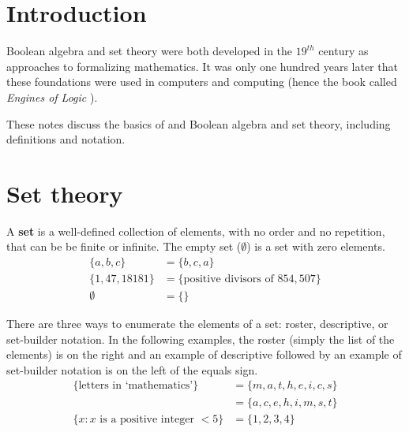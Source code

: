 \documentclass[11pt]{article}%
\begin{document}
\setlength{\baselineskip}{1.1\baselineskip}%


\begin{multicols}{2}

\section{Introduction}
\label{Introduction}

Boolean algebra and set theory were both developed in the $19^{th}$ century as approaches to formalizing mathematics. It was only one hundred years later that these foundations were used in computers and computing (hence the book called \textit{Engines of Logic} \citep{book:engines-of-logic}).

These notes discuss the basics of and Boolean algebra and set theory, including definitions and notation.

\section{Set theory}
\label{Set}

A \textbf{set} is a well-defined collection of elements, with no order and no repetition, that can be be finite or infinite. The empty set ($\emptyset$) is a set with zero elements.
\begin{align*}
 \{a, b, c\} &= \{b, c, a\}\\
 \{1, 47, 18181\} &= \{\text{positive divisors of } 854,507\}\\
 \emptyset &= \{\}
\end{align*}

There are three ways to enumerate the elements of a set: roster, descriptive, or set-builder notation. In the following examples, the roster (simply the list of the elements) is on the right and an example of descriptive followed by an example of set-builder notation is on the left of the equals sign. \begin{align*}
 \{\text{letters in `mathematics'}\} &= \{m, a, t, h, e, i, c, s\}\\
 &= \{a, c, e, h, i, m, s, t\}\\
 \{x : x\text{ is a positive integer }<5\} &= \{1, 2, 3, 4\}
\end{align*}


\end{multicols}
\end{document}
